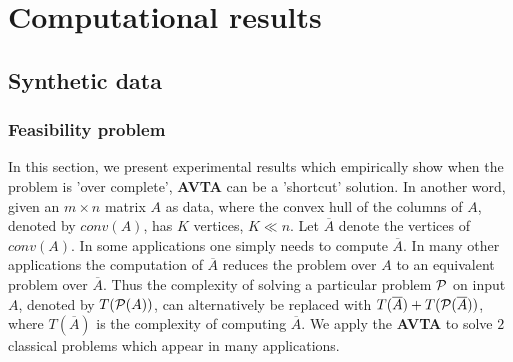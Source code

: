 \documentclass[]{article}
\begin{document}
	\noindent
\section{Computational results}
	\subsection{Synthetic data}
	\subsubsection{Feasibility problem}
	
	  
	In this section, we present experimental results which empirically show when the problem is 'over complete', \textbf{AVTA} can be a 'shortcut' solution. In another word, given an $m\times n$ matrix $A$ as data, where the convex hull of the columns of $A$, denoted by $conv(A)$, has $K$ vertices, $K \ll n$.  Let $\overline A$ denote the vertices of $conv(A)$. In some applications one simply needs to compute $\overline A$.  In many other applications the computation of $\overline A$ reduces the problem over $A$ to an equivalent problem over $\overline A$. Thus the complexity of solving a particular problem $\cal{P}$ on input $A$, denoted by $T({\cal{P}}(A))$, can alternatively be replaced with $T(\overline A)+ T({\cal{P}}(\overline A))$, where $T(\overline A)$ is the complexity of computing $\overline A$. We apply the \textbf{AVTA} to solve $2$ classical problems which appear in many applications. 
	
	
	
\end{document}
